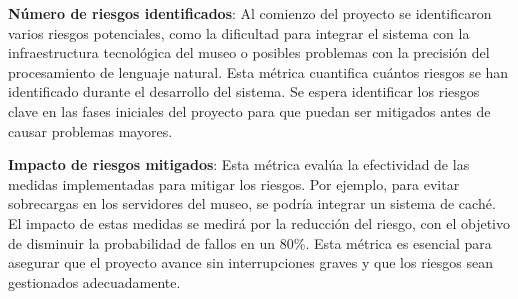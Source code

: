 \documentclass{report}
\begin{document}
    \justify
    \textbf{Número de riesgos identificados}: Al comienzo del proyecto se identificaron varios riesgos potenciales, como la dificultad para integrar el sistema con la infraestructura tecnológica del museo o posibles problemas con la precisión del procesamiento de lenguaje natural. Esta métrica cuantifica cuántos riesgos se han identificado durante el desarrollo del sistema. Se espera identificar los riesgos clave en las fases iniciales del proyecto para que puedan ser mitigados antes de causar problemas mayores.

    \justify
    \textbf{Impacto de riesgos mitigados}: Esta métrica evalúa la efectividad de las medidas implementadas para mitigar los riesgos. Por ejemplo, para evitar sobrecargas en los servidores del museo, se podría integrar un sistema de caché. El impacto de estas medidas se medirá por la reducción del riesgo, con el objetivo de disminuir la probabilidad de fallos en un 80\%. Esta métrica es esencial para asegurar que el proyecto avance sin interrupciones graves y que los riesgos sean gestionados adecuadamente.


            
            
            
            
\end{document}
